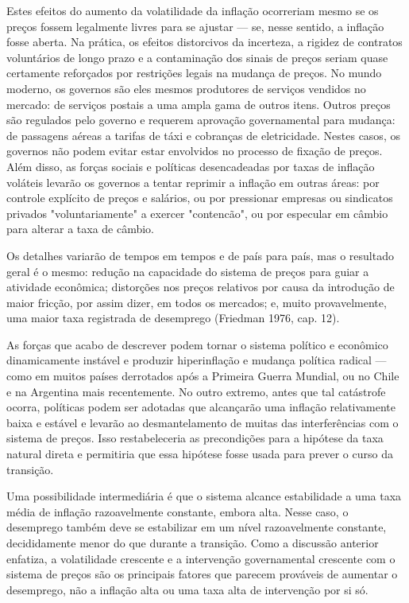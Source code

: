 \documentclass[12pt]{article}
\begin{document}
Estes efeitos do aumento da volatilidade da inflação ocorreriam mesmo se os preços fossem legalmente livres para se ajustar — se, nesse sentido, a inflação fosse aberta. Na prática, os efeitos distorcivos da incerteza, a rigidez de contratos voluntários de longo prazo e a contaminação dos sinais de preços seriam quase certamente reforçados por restrições legais na mudança de preços. No mundo moderno, os governos são eles mesmos produtores de serviços vendidos no mercado: de serviços postais a uma ampla gama de outros itens. Outros preços são regulados pelo governo e requerem aprovação governamental para mudança: de passagens aéreas a tarifas de táxi e cobranças de eletricidade. Nestes casos, os governos não podem evitar estar envolvidos no processo de fixação de preços. Além disso, as forças sociais e políticas desencadeadas por taxas de inflação voláteis levarão os governos a tentar reprimir a inflação em outras áreas: por controle explícito de preços e salários, ou por pressionar empresas ou sindicatos privados "voluntariamente" a exercer "contencão", ou por especular em câmbio para alterar a taxa de câmbio.

Os detalhes variarão de tempos em tempos e de país para país, mas o resultado geral é o mesmo: redução na capacidade do sistema de preços para guiar a atividade econômica; distorções nos preços relativos por causa da introdução de maior fricção, por assim dizer, em todos os mercados; e, muito provavelmente, uma maior taxa registrada de desemprego (Friedman 1976, cap. 12).

As forças que acabo de descrever podem tornar o sistema político e econômico dinamicamente instável e produzir hiperinflação e mudança política radical — como em muitos países derrotados após a Primeira Guerra Mundial, ou no Chile e na Argentina mais recentemente. No outro extremo, antes que tal catástrofe ocorra, políticas podem ser adotadas que alcançarão uma inflação relativamente baixa e estável e levarão ao desmantelamento de muitas das interferências com o sistema de preços. Isso restabeleceria as precondições para a hipótese da taxa natural direta e permitiria que essa hipótese fosse usada para prever o curso da transição.

Uma possibilidade intermediária é que o sistema alcance estabilidade a uma taxa média de inflação razoavelmente constante, embora alta. Nesse caso, o desemprego também deve se estabilizar em um nível razoavelmente constante, decididamente menor do que durante a transição. Como a discussão anterior enfatiza, a volatilidade crescente e a intervenção governamental crescente com o sistema de preços são os principais fatores que parecem prováveis de aumentar o desemprego, não a inflação alta ou uma taxa alta de intervenção por si só.
\end{document}
